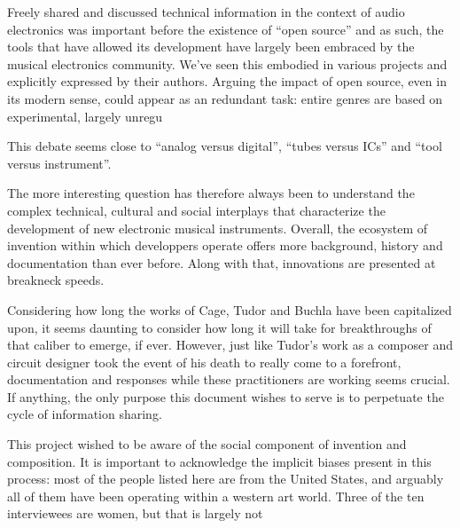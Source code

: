 Freely shared and discussed technical information in the context of audio electronics was important before the existence of ``open source'' and as such, the tools that have allowed its development have largely been embraced by the musical electronics community. We've seen this embodied in various projects and explicitly expressed by their authors. Arguing the impact of open source, even in its modern sense, could  appear as an redundant task: entire genres are based on experimental, largely unregu



 This debate seems close to ``analog versus digital'', ``tubes versus ICs'' and ``tool versus instrument''. 

The more interesting question has therefore always been to understand the complex technical, cultural and social interplays that characterize the development of new electronic musical instruments. Overall, the ecosystem of invention within which developpers operate offers more background, history and documentation than ever before. Along with that, innovations are presented at breakneck speeds. 

Considering how long the works of Cage, Tudor and Buchla have been capitalized upon, it seems daunting to consider how long it will take for breakthroughs of that caliber to emerge, if ever. However, just like Tudor's work as a composer and circuit designer took the event of his death to really come to a forefront, documentation and responses while these practitioners are working seems crucial. If anything, the only purpose this document wishes to serve is to perpetuate the cycle of information sharing. 

This project wished to be aware of the social component of invention and composition. It is important to acknowledge the implicit biases present in this process: most of the people listed here are from the United States, and arguably all of them have been operating within a western art world. Three of the ten interviewees are women, but that is largely not 